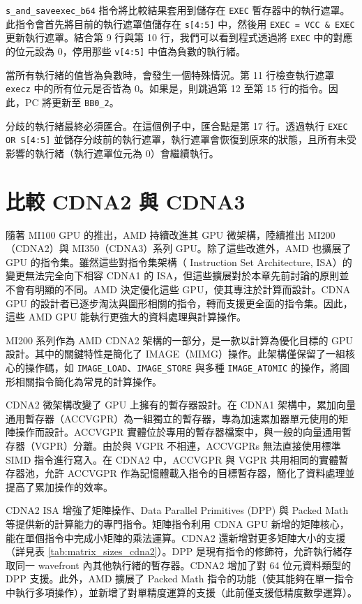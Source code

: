 \lstinline|s_and_saveexec_b64| 指令將比較結果套用到儲存在 \lstinline|EXEC| 暫存器中的執行遮罩。此指令會首先將目前的執行遮罩值儲存在 \lstinline|s[4:5]| 中，然後用 \lstinline|EXEC = VCC & EXEC| 更新執行遮罩。結合第 9 行與第 10 行，我們可以看到程式透過將 \lstinline|EXEC| 中的對應的位元設為 0，停用那些 \lstinline|v[4:5]| 中值為負數的執行緒。

當所有執行緒的值皆為負數時，會發生一個特殊情況。第 11 行檢查執行遮罩 \lstinline|execz| 中的所有位元是否皆為 0。如果是，則跳過第 12 至第 15 行的指令。因此，PC 將更新至 \lstinline|BB0_2|。

分歧的執行緒最終必須匯合。在這個例子中，匯合點是第 17 行。透過執行 \lstinline|EXEC OR S[4:5]| 並儲存分歧前的執行遮罩，執行遮罩會恢復到原來的狀態，且所有未受影響的執行緒（執行遮罩位元為 0）會繼續執行。


\section{比較 CDNA2 與 CDNA3}

隨著 MI100 GPU 的推出，AMD 持續改進其 GPU 微架構，陸續推出 MI200（CDNA2）與 MI350（CDNA3）系列 GPU。除了這些改進外，AMD 也擴展了 GPU 的指令集。雖然這些對指令集架構（ Instruction Set Architecture, ISA）的變更無法完全向下相容 CDNA1 的 ISA，但這些擴展對於本章先前討論的原則並不會有明顯的不同。AMD 決定優化這些 GPU，使其專注於計算而設計。CDNA GPU 的設計者已逐步淘汰與圖形相關的指令，轉而支援更全面的指令集。因此，這些 AMD GPU 能執行更強大的資料處理與計算操作。

MI200 系列作為 AMD CDNA2 架構的一部分，是一款以計算為優化目標的 GPU 設計。其中的關鍵特性是簡化了 IMAGE（MIMG）操作。此架構僅保留了一組核心的操作碼，如 \lstinline|IMAGE_LOAD|、\lstinline|IMAGE_STORE| 與多種 \lstinline|IMAGE_ATOMIC| 的操作，將圖形相關指令簡化為常見的計算操作。

CDNA2 微架構改變了 GPU 上擁有的暫存器設計。在 CDNA1 架構中，累加向量通用暫存器（ACCVGPR）為一組獨立的暫存器，專為加速累加器單元使用的矩陣操作而設計。ACCVGPR 實體位於專用的暫存器檔案中，與一般的向量通用暫存器（VGPR）分離。由於與 VGPR 不相連，ACCVGPRs 無法直接使用標準 SIMD 指令進行寫入。在 CDNA2 中，ACCVGPR 與 VGPR 共用相同的實體暫存器池，允許 ACCVGPR 作為記憶體載入指令的目標暫存器，簡化了資料處理並提高了累加操作的效率。

CDNA2 ISA 增強了矩陣操作、Data Parallel Primitives (DPP) 與 Packed Math 等提供新的計算能力的專門指令。矩陣指令利用 CDNA GPU 新增的矩陣核心，能在單個指令中完成小矩陣的乘法運算。CDNA2 還新增對更多矩陣大小的支援（詳見表 \ref{tab:matrix_sizes_cdna2}）。DPP 是現有指令的修飾符，允許執行緒存取同一 wavefront 內其他執行緒的暫存器。CDNA2 增加了對 64 位元資料類型的 DPP 支援。此外，AMD 擴展了 Packed Math 指令的功能（使其能夠在單一指令中執行多項操作），並新增了對單精度運算的支援（此前僅支援低精度數學運算）。


